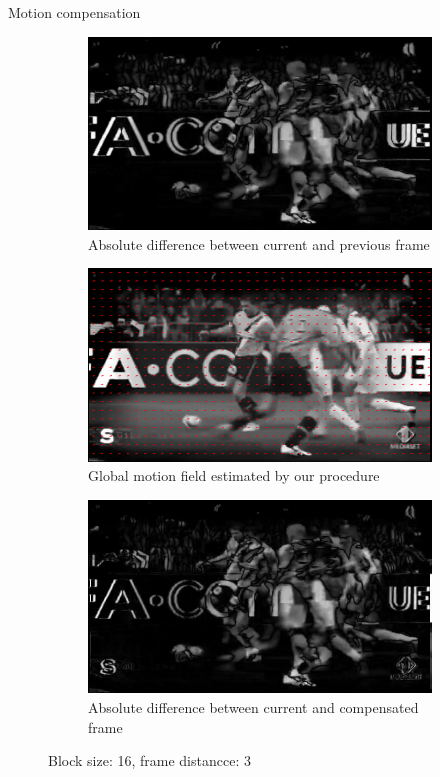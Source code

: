 \documentclass[aspectratio=1610,xcolor=dvipsnames]{beamer}
\begin{document}
\begin{frame}{Motion compensation}
\begin{figure}[htbp]
        \begin{subfigure}[b]{0.3\textwidth}
            \centering
            \includegraphics[width=.9\textwidth]{images/dp-curr_prev_diff.png}
            \caption{Absolute difference between current and previous frame}
            \label{fig:dp-diff-curr-prev}
        \end{subfigure}
        \hfill
        \begin{subfigure}[b]{0.3\textwidth}
            \includegraphics[width=.9\textwidth]{images/dp-model_motion_field.png}
            \caption{Global motion field estimated by our procedure}
            \label{fig:dp-est-mf}
        \end{subfigure}
        \hfill
        \begin{subfigure}[b]{0.3\textwidth}
            \includegraphics[width=.9\textwidth]{images/dp-curr_comp_diff.png}
            \caption{Absolute difference between current and compensated frame}
            \label{fig:dp-diff-curr-comp}
        \end{subfigure}
    
        \caption{Block size: 16, frame distancce: 3}
    \end{figure}
\end{frame}
\end{document}
